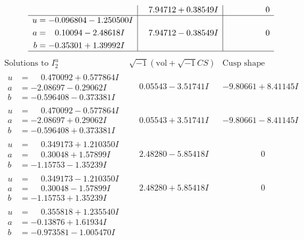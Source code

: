 \documentclass[1p]{elsarticle_modified}
\theoremstyle{definition}
\newcommand{\I}{\sqrt{-1}}
\begin{document}
$$\begin{array}{c|c|c}
 & \phantom{-}7.94712 + 0.38549 I & \phantom{-0.000000 } 0 \\ \hline\begin{aligned}
u &= -0.096804 - 1.250500 I \\
a &= \phantom{-}0.10094 - 2.48618 I \\
b &= -0.35301 + 1.39992 I\end{aligned}
 & \phantom{-}7.94712 - 0.38549 I & \phantom{-0.000000 } 0\\
 \hline 
 \end{array}$$\newpage$$\begin{array}{c|c|c}  
\text{Solutions to }I^u_{2}& \I (\text{vol} + \sqrt{-1}CS) & \text{Cusp shape}\\
 \hline 
\begin{aligned}
u &= \phantom{-}0.470092 + 0.577864 I \\
a &= -2.08697 - 0.29062 I \\
b &= -0.596408 - 0.373381 I\end{aligned}
 & \phantom{-}0.05543 - 3.51741 I & -9.80661 + 8.41145 I \\ \hline\begin{aligned}
u &= \phantom{-}0.470092 - 0.577864 I \\
a &= -2.08697 + 0.29062 I \\
b &= -0.596408 + 0.373381 I\end{aligned}
 & \phantom{-}0.05543 + 3.51741 I & -9.80661 - 8.41145 I \\ \hline\begin{aligned}
u &= \phantom{-}0.349173 + 1.210350 I \\
a &= \phantom{-}0.30048 + 1.57899 I \\
b &= -1.15753 - 1.35239 I\end{aligned}
 & \phantom{-}2.48280 - 5.85418 I & \phantom{-0.000000 } 0 \\ \hline\begin{aligned}
u &= \phantom{-}0.349173 - 1.210350 I \\
a &= \phantom{-}0.30048 - 1.57899 I \\
b &= -1.15753 + 1.35239 I\end{aligned}
 & \phantom{-}2.48280 + 5.85418 I & \phantom{-0.000000 } 0 \\ \hline\begin{aligned}
u &= \phantom{-}0.355818 + 1.235540 I \\
a &= -0.13876 + 1.61934 I \\
b &= -0.973581 - 1.005470 I\end{aligned}

\end{array}$$
\end{document}
